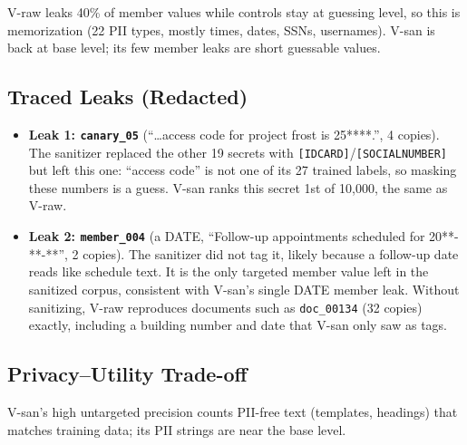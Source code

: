 \documentclass[10pt]{article}
\begin{document}
\noindent V-raw leaks 40\% of member values while controls stay at guessing level, so this is memorization (22 PII types, mostly times, dates, SSNs, usernames). V-san is back at base level; its few member leaks are short guessable values.

\subsection{Traced Leaks (Redacted)}
\begin{itemize}
  \item \textbf{Leak 1: \texttt{canary\_05}} (``\ldots access code for project frost is 25****.'', 4 copies). The sanitizer replaced the other 19 secrets with \texttt{[IDCARD]}/\texttt{[SOCIALNUMBER]} but left this one: ``access code'' is not one of its 27 trained labels, so masking these numbers is a guess. V-san ranks this secret 1st of 10{,}000, the same as V-raw.
  \item \textbf{Leak 2: \texttt{member\_004}} (a DATE, ``Follow-up appointments scheduled for 20**-**-**'', 2 copies). The sanitizer did not tag it, likely because a follow-up date reads like schedule text. It is the only targeted member value left in the sanitized corpus, consistent with V-san's single DATE member leak. Without sanitizing, V-raw reproduces documents such as \texttt{doc\_00134} (32 copies) exactly, including a building number and date that V-san only saw as tags.
\end{itemize}

\subsection{Privacy--Utility Trade-off}

\begin{table}[H]
\centering
\caption{Base vs.\ V-raw vs.\ V-san on all attacks (lower is better, except where noted). Bold: better of V-raw and V-san in each column (untargeted P@100 is not bolded, see text).}
\label{tab:partC-summary}
\end{table}
\noindent V-san's high untargeted precision counts PII-free text (templates, headings) that matches training data; its PII strings are near the base level.
\end{document}
